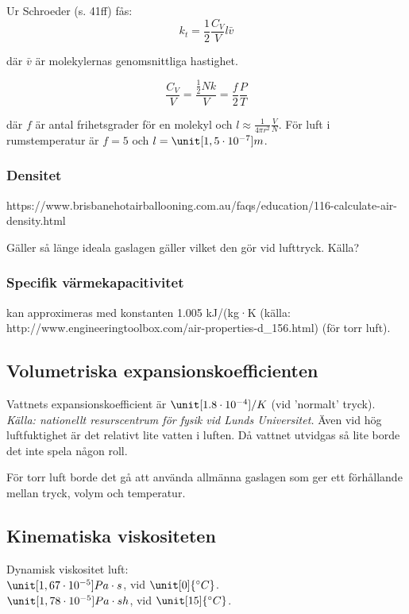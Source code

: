 Ur Schroeder (s. 41ff) fås:
\begin{equation}
k_t=\frac{1}{2}\frac{C_V}{V} l \bar{v}
\end{equation}

där $\bar{v}$ är molekylernas genomsnittliga hastighet.

\begin{equation}
\frac{C_V}{V}=\frac{\tfrac{1}{2}Nk}{V}=\frac{f}{2}\frac{P}{T}
\end{equation}

där $f$ är antal frihetsgrader för en molekyl och $l\approx\frac{1}{4\pi r^2}\frac{V}{N}$. För luft i rumstemperatur är $f=5$ och $l=\unit[1,5\cdot 10^{-7}]{m}$.



\subsubsection{Densitet} %
\label{sec:densitet}

https://www.brisbanehotairballooning.com.au/faqs/education/116-calculate-air-density.html

Gäller så länge ideala gaslagen gäller vilket den gör vid lufttryck. Källa?


\subsubsection{Specifik värmekapacitivitet}
kan approximeras med konstanten 1.005 kJ/(kg·K (källa: http://www.engineeringtoolbox.com/air-properties-d\_156.html) (för torr luft).


\subsection{Volumetriska expansionskoefficienten} %
Vattnets expansionskoefficient är $\unit[1.8\cdot 10^{-4}]{/K}$ (vid 'normalt' tryck). \emph{Källa: nationellt resurscentrum för fysik vid Lunds Universitet.} Även vid hög luftfuktighet är det relativt lite vatten i luften. Då vattnet utvidgas så lite borde det inte spela någon roll.

För torr luft borde det gå att använda allmänna gaslagen som ger ett förhållande mellan tryck, volym och temperatur.


\subsection{Kinematiska viskositeten} %
Dynamisk viskositet luft:\\
$\unit[1,67\cdot10^{-5}]{Pa\cdot s}$, vid $\unit[0]{^\circ C}$.\\
$\unit[1,78\cdot10^{-5}]{Pa\cdot sh}$, vid $\unit[15]{^\circ C}$.

